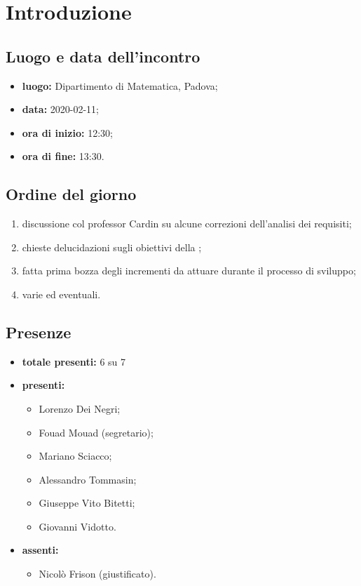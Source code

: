 \section*{Introduzione}

\subsection*{Luogo e data dell'incontro}
	\begin{itemize}
		\item \textbf{luogo:} Dipartimento di Matematica, Padova;
		\item \textbf{data:} 2020-02-11;
		\item \textbf{ora di inizio:} 12:30;
		\item \textbf{ora di fine:} 13:30.
	\end{itemize}

\subsection*{Ordine del giorno}
	\begin{enumerate}
			\item discussione col professor Cardin su alcune correzioni dell'analisi dei requisiti;
  			\item chieste delucidazioni sugli obiettivi della ;
  			\item fatta prima bozza degli incrementi da attuare durante il processo di sviluppo;
  			\item varie ed eventuali.
	\end{enumerate}

\subsection*{Presenze}
	\begin{itemize}
		\item \textbf{totale presenti:} 6 su 7
		\item \textbf{presenti: }
			\begin{itemize}			
				\item Lorenzo Dei Negri;
				\item Fouad Mouad (segretario);
				\item Mariano Sciacco;
				\item Alessandro Tommasin;
				\item Giuseppe Vito Bitetti;
				\item Giovanni Vidotto.
			\end{itemize}
		\item \textbf{assenti: } 
			\begin{itemize}	
				\item Nicolò Frison (giustificato).
			\end{itemize}
	\end{itemize}


